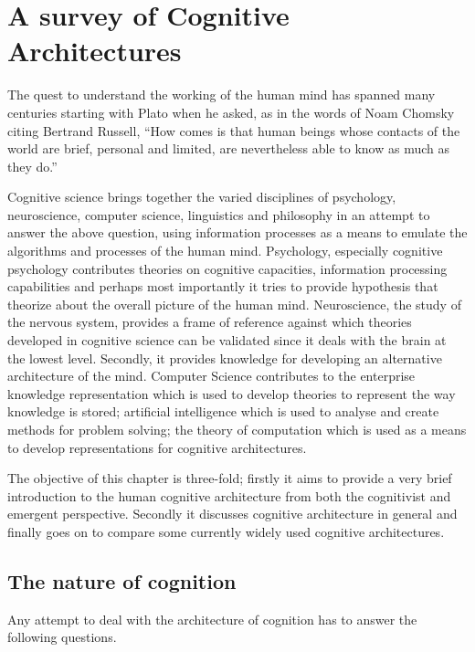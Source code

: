 \chapter{A survey of Cognitive Architectures}
\label{The_nature_of_cognition}

The quest to understand the working of the human mind has spanned
many centuries starting with Plato when he asked, as in the words of
Noam Chomsky citing Bertrand Russell, ``How comes is that human beings
whose contacts of the world are brief, personal and limited, are
nevertheless able to know as much as they do.'' \cite{Bogdan:1993aa}

Cognitive science brings together the varied disciplines of
psychology, neuroscience, computer science, linguistics and philosophy in an
attempt to answer the above question, using information processes as a
means to emulate the algorithms and processes of the human
mind. Psychology, especially cognitive psychology contributes theories
on cognitive capacities, information processing capabilities and
perhaps most importantly it tries to provide hypothesis that theorize
about the overall picture of the human mind. Neuroscience, the study
of the nervous system,  provides a frame of reference against which
theories developed in cognitive science can be validated since it
deals with the brain at the lowest level. Secondly, it provides  knowledge
for developing an alternative architecture of the mind. Computer
Science contributes to the enterprise knowledge representation which is
used to develop theories to represent the way knowledge is stored;
artificial intelligence which is used to analyse and create methods
for problem solving; the theory of computation which is used as a
means to develop representations for cognitive
architectures.

The objective of this chapter is three-fold; firstly it aims
to provide a very brief introduction to the human cognitive
architecture from both the cognitivist and
emergent\cite{DBLP:journals/tec/VernonMS07} perspective. Secondly
it discusses cognitive architecture in general and finally goes on
to compare some currently widely used cognitive architectures.

\section{The nature of cognition}
\label{nature_Of_Cognition}
Any attempt to deal with the architecture of cognition has to answer
the following questions.

